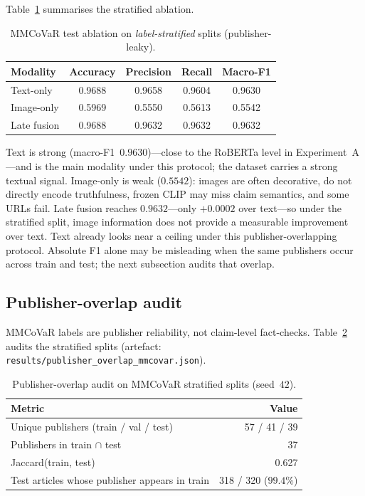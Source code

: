 \documentclass[12pt, a4paper]{report}
\begin{document}
Table~\ref{tab:ablation} summarises the stratified ablation.

\begin{table}[htbp]
\centering
\caption{MMCoVaR test ablation on \emph{label-stratified} splits (publisher-leaky).}
\label{tab:ablation}
\begin{tabular}{lcccc}
\hline
Modality & Accuracy & Precision & Recall & Macro-F1 \\
\hline
Text-only   & 0.9688 & 0.9658 & 0.9604 & 0.9630 \\
Image-only  & 0.5969 & 0.5550 & 0.5613 & 0.5542 \\
Late fusion & 0.9688 & 0.9632 & 0.9632 & 0.9632 \\
\hline
\end{tabular}
\end{table}

Text is strong (macro-F1~$0.9630$)---close to the RoBERTa level in Experiment~A---and is the main modality under this protocol; the dataset carries a strong textual signal.
Image-only is weak ($0.5542$): images are often decorative, do not directly encode truthfulness, frozen CLIP may miss claim semantics, and some URLs fail.
Late fusion reaches $0.9632$---only $+0.0002$ over text---so under the stratified split, image information does not provide a measurable improvement over text.
Text already looks near a ceiling under this publisher-overlapping protocol.
Absolute F1 alone may be misleading when the same publishers occur across train and test; the next subsection audits that overlap.

\subsection{Publisher-overlap audit}
\label{sec:publisher-overlap}

MMCoVaR labels are publisher reliability, not claim-level fact-checks.
Table~\ref{tab:publisher-overlap} audits the stratified splits (artefact: \texttt{results/publisher\_overlap\_mmcovar.json}).

\begin{table}[htbp]
\centering
\caption{Publisher-overlap audit on MMCoVaR stratified splits (seed~$42$).}
\label{tab:publisher-overlap}
\begin{tabular}{lr}
\hline
Metric & Value \\
\hline
Unique publishers (train / val / test) & 57 / 41 / 39 \\
Publishers in train $\cap$ test & 37 \\
Jaccard(train, test) & 0.627 \\
Test articles whose publisher appears in train & 318 / 320 ($99.4\%$) \\
\hline
\end{tabular}
\end{table}
\end{document}
